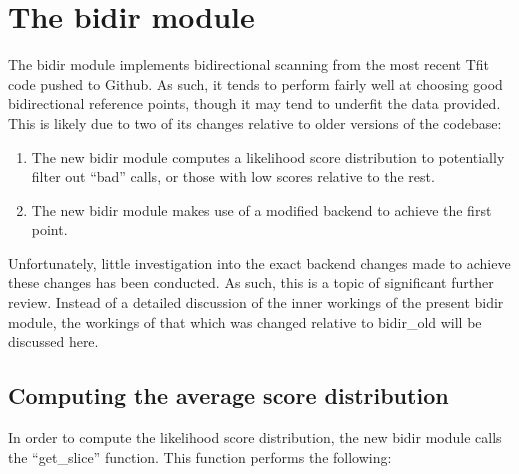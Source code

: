 \documentclass[12pt,letterpaper]{article}
\begin{document}
\section{The bidir module}
The bidir module implements bidirectional scanning from the most recent Tfit code pushed to Github. As such, it tends to perform fairly well at choosing good bidirectional reference points, though it may tend to underfit the data provided. This is likely due to two of its changes relative to older versions of the codebase:

\begin{enumerate}
\item The new bidir module computes a likelihood score distribution to potentially filter out ``bad'' calls, or those with low scores relative to the rest.
\item The new bidir module makes use of a modified backend to achieve the first point.
\end{enumerate}

Unfortunately, little investigation into the exact backend changes made to achieve these changes has been conducted. As such, this is a topic of significant further review. Instead of a detailed discussion of the inner workings of the present bidir module, the workings of that which was changed relative to bidir\_old will be discussed here.

\subsection{Computing the average score distribution}
In order to compute the likelihood score distribution, the new bidir module calls the ``get\_slice'' function. This function performs the following:
\end{document}
